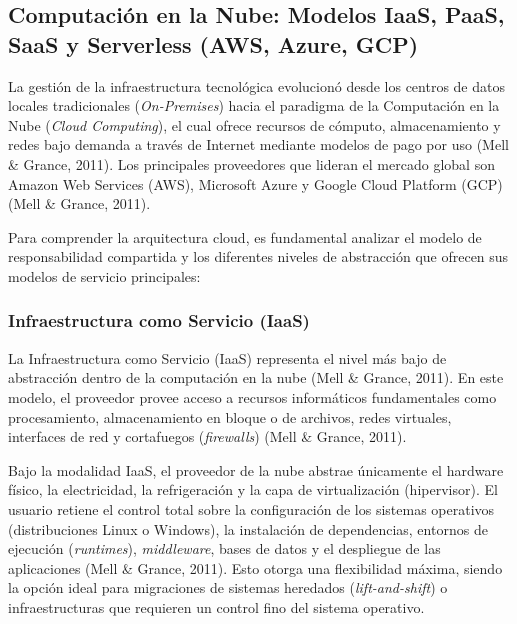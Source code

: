 \hypertarget{computaciuxf3n-en-la-nube-modelos-iaas-paas-saas-y-serverless-aws-azure-gcp}{%
\subsection{\texorpdfstring{\textbf{Computación en la Nube: Modelos
IaaS, PaaS, SaaS y Serverless (AWS, Azure,
GCP)}}{Computación en la Nube: Modelos IaaS, PaaS, SaaS y Serverless (AWS, Azure, GCP)}}\label{computaciuxf3n-en-la-nube-modelos-iaas-paas-saas-y-serverless-aws-azure-gcp}}

La gestión de la infraestructura tecnológica evolucionó desde los
centros de datos locales tradicionales (\emph{On-Premises}) hacia el
paradigma de la Computación en la Nube (\emph{Cloud Computing}), el cual
ofrece recursos de cómputo, almacenamiento y redes bajo demanda a través
de Internet mediante modelos de pago por uso (Mell \& Grance, 2011). Los
principales proveedores que lideran el mercado global son Amazon Web
Services (AWS), Microsoft Azure y Google Cloud Platform (GCP) (Mell \&
Grance, 2011).

Para comprender la arquitectura cloud, es fundamental analizar el modelo
de responsabilidad compartida y los diferentes niveles de abstracción
que ofrecen sus modelos de servicio principales:

\hypertarget{infraestructura-como-servicio-iaas}{%
\subsubsection{\texorpdfstring{\textbf{Infraestructura como Servicio
(IaaS)}}{Infraestructura como Servicio (IaaS)}}\label{infraestructura-como-servicio-iaas}}

La Infraestructura como Servicio (IaaS) representa el nivel más bajo de
abstracción dentro de la computación en la nube (Mell \& Grance, 2011).
En este modelo, el proveedor provee acceso a recursos informáticos
fundamentales como procesamiento, almacenamiento en bloque o de
archivos, redes virtuales, interfaces de red y cortafuegos
(\emph{firewalls}) (Mell \& Grance, 2011).

Bajo la modalidad IaaS, el proveedor de la nube abstrae únicamente el
hardware físico, la electricidad, la refrigeración y la capa de
virtualización (hipervisor). El usuario retiene el control total sobre
la configuración de los sistemas operativos (distribuciones Linux o
Windows), la instalación de dependencias, entornos de ejecución
(\emph{runtimes}), \emph{middleware}, bases de datos y el despliegue de
las aplicaciones (Mell \& Grance, 2011). Esto otorga una flexibilidad
máxima, siendo la opción ideal para migraciones de sistemas heredados
(\emph{lift-and-shift}) o infraestructuras que requieren un control fino
del sistema operativo.

